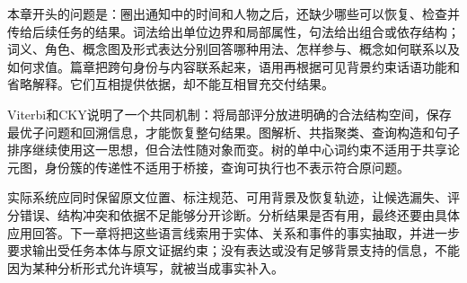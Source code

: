 本章开头的问题是：圈出通知中的时间和人物之后，还缺少哪些可以恢复、检查并传给后续任务的结果。词法给出单位边界和局部属性，句法给出组合或依存结构；词义、角色、概念图及形式表达分别回答哪种用法、怎样参与、概念如何联系以及如何求值。篇章把跨句身份与内容联系起来，语用再根据可见背景约束话语功能和省略解释。它们互相提供依据，却不能互相冒充交付结果。

Viterbi和CKY说明了一个共同机制：将局部评分放进明确的合法结构空间，保存最优子问题和回溯信息，才能恢复整句结果。图解析、共指聚类、查询构造和句子排序继续使用这一思想，但合法性随对象而变。树的单中心词约束不适用于共享论元图，身份簇的传递性不适用于桥接，查询可执行也不表示符合原问题。

实际系统应同时保留原文位置、标注规范、可用背景及恢复轨迹，让候选漏失、评分错误、结构冲突和依据不足能够分开诊断。分析结果是否有用，最终还要由具体应用回答。下一章将把这些语言线索用于实体、关系和事件的事实抽取，并进一步要求输出受任务本体与原文证据约束；没有表达或没有足够背景支持的信息，不能因为某种分析形式允许填写，就被当成事实补入。
